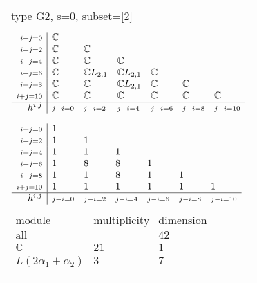 \documentclass[crop,border=2mm]{standalone}
\begin{document}
\begin{tabular}{l}
{\huge type G2, s=0, subset=[2]}\\ \\


$\displaystyle
\begin{array}{r|l l l l l l}
	{\scriptstyle i+j=0}&\mathbb{C}&&&&&\\
	{\scriptstyle i+j=2}&\mathbb{C}&\mathbb{C}&&&&\\
	{\scriptstyle i+j=4}&\mathbb{C}&\mathbb{C}&\mathbb{C}&&&\\
	{\scriptstyle i+j=6}&\mathbb{C}&\mathbb{C}L_{2,1}&\mathbb{C}L_{2,1}&\mathbb{C}&&\\
	{\scriptstyle i+j=8}&\mathbb{C}&\mathbb{C}&\mathbb{C}L_{2,1}&\mathbb{C}&\mathbb{C}&\\
	{\scriptstyle i+j=10}&\mathbb{C}&\mathbb{C}&\mathbb{C}&\mathbb{C}&\mathbb{C}&\mathbb{C}\\
	\hline h^{i,j}&{\scriptstyle j-i=0}&{\scriptstyle j-i=2}&{\scriptstyle j-i=4}&{\scriptstyle j-i=6}&{\scriptstyle j-i=8}&{\scriptstyle j-i=10}
\end{array}
$ \\ \\


$\displaystyle
\begin{array}{r|l l l l l l}
	{\scriptstyle i+j=0}&1&&&&&\\
	{\scriptstyle i+j=2}&1&1&&&&\\
	{\scriptstyle i+j=4}&1&1&1&&&\\
	{\scriptstyle i+j=6}&1&8&8&1&&\\
	{\scriptstyle i+j=8}&1&1&8&1&1&\\
	{\scriptstyle i+j=10}&1&1&1&1&1&1\\
	\hline h^{i,j}&{\scriptstyle j-i=0}&{\scriptstyle j-i=2}&{\scriptstyle j-i=4}&{\scriptstyle j-i=6}&{\scriptstyle j-i=8}&{\scriptstyle j-i=10}
\end{array}
$ \\ \\


$\displaystyle
\begin{array}{rll}
	\text{module}&\text{multiplicity}&\text{dimension} \\ \hline \text{all}&&42 \\
	\mathbb{C}&21&1\\
	L\left( 2\alpha_{1}+\alpha_{2}\right)&3&7
\end{array}
$ \\ \\

\end{tabular}
\end{document}
